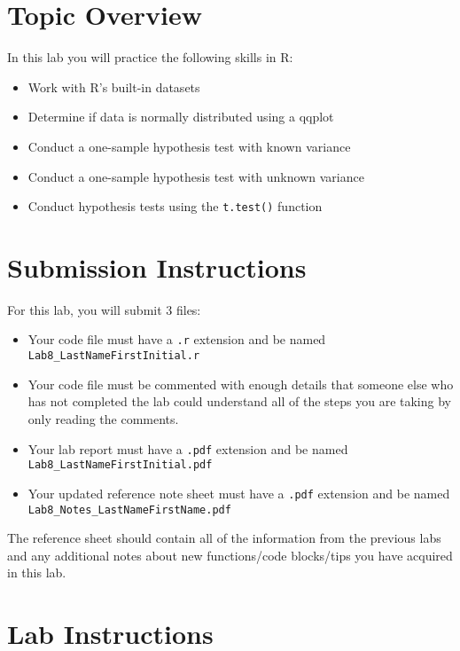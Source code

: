 \documentclass{article}
\begin{document}
\section{Topic Overview}


In this lab you will practice the following skills in R:

\begin{itemize}
    \item Work with R’s built-in datasets
    \item Determine if data is normally distributed using a qqplot
    \item Conduct a one-sample hypothesis test with known variance
    \item Conduct a one-sample hypothesis test with unknown variance
    \item Conduct hypothesis tests using the \texttt{t.test()} function
\end{itemize}

\section*{Submission Instructions}

For this lab, you will submit 3 files:

\begin{itemize}
    \item Your code file must have a \texttt{.r} extension and be named \\ \texttt{Lab8\_LastNameFirstInitial.r}
    \item Your code file must be commented with enough details that someone else who has not completed the lab could understand all of the steps you are taking by only reading the comments.
    \item Your lab report must have a \texttt{.pdf} extension and be named \\ \texttt{Lab8\_LastNameFirstInitial.pdf}
    \item Your updated reference note sheet must have a \texttt{.pdf} extension and be named \\ \texttt{Lab8\_Notes\_LastNameFirstName.pdf}
\end{itemize}

The reference sheet should contain all of the information from the previous labs and any additional notes about new functions/code blocks/tips you have acquired in this lab.

\section*{Lab Instructions}
\end{document}
